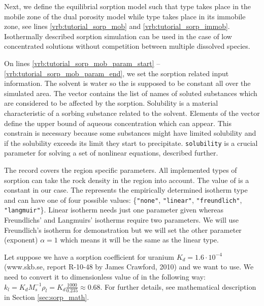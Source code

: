 Next, we define the equilibrial sorption model such that  type takes place in the mobile 
zone of the dual porosity model while  type takes place in its immobile zone, see lines \ref{vrb:tutorial_sorp_mob} and \ref{vrb:tutorial_sorp_immob}.
Isothermally described sorption simulation can be used in the case of low concentrated solutions without competition between multiple dissolved species.

On lines \ref{vrb:tutorial_sorp_mob_param_start} -- \ref{vrb:tutorial_sorp_mob_param_end}, we set the sorption related input information. The solvent is water so the  
is supposed to be constant all over the simulated area. The vector  
contains the list of names of soluted substances which are considered to be affected by the sorption.
Solubility is a material characteristic of a sorbing substance related to the solvent. Elements of the vector 
 define the upper bound of aqueous concentration which can appear.
This constrain is necessary because some substances might have limited solubility and if the solubility exceeds 
its limit they start to precipitate. {\tt solubility} is a crucial parameter for solving a set of nonlinear 
equations, described further. 

The record  covers the region specific parameters.
All implemented types of sorption can take the rock density in the region into account. The value of 
 is a constant in our case. 
The  represents the empirically determined isotherm 
type and can have one of four possible values: \{{\tt"none"}, {\tt"linear"}, {\tt"freundlich"}, {\tt"langmuir"}\}. 
Linear isotherm needs just one parameter given whereas Freundlichs' and Langmuirs' isotherms require two parameters. 
We will use Freundlich's isotherm for demonstration but we will set the other parameter (exponent) $\alpha=1$ 
which means it will be the same as the linear type. 

Let suppose we have a sorption coefficient for uranium $K_d=1.6\cdot10^{-4}$  (www.skb.se, report R-10-48 by James Crawford, 2010) 
and we want to use. We need to convert it to dimensionless value of 
in the following way: $k_l = K_dM_s^{-1}\rho_l = K_d\frac{1000}{0.235}\approx0.68$. For further details, see 
mathematical description in Section \ref{sec:sorp_math}. 

